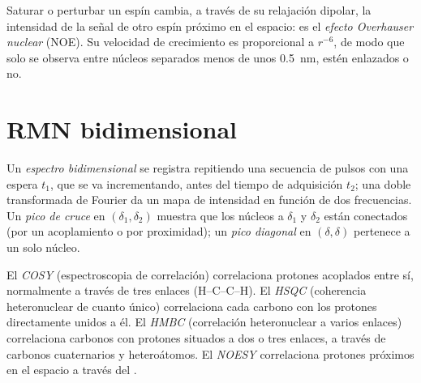 \begin{definition}\label{def:b3:advanced-nmr:noe}
Saturar o perturbar un espín cambia, a través de su relajación
dipolar, la intensidad de la señal de otro espín próximo en el espacio:
es el \emph{efecto Overhauser nuclear} (NOE).
Su velocidad de crecimiento es proporcional a $r^{-6}$, de modo que solo se observa entre
núcleos separados menos de unos \qty{0.5}{nm}, estén enlazados o no.
\end{definition}

\section{RMN bidimensional}

\begin{definition}\label{def:b3:advanced-nmr:two-d}
Un \emph{espectro bidimensional} se registra
repitiendo una secuencia de pulsos con una espera $t_1$, que se va incrementando, antes del
tiempo de adquisición $t_2$; una doble transformada de Fourier da un mapa de intensidad
en función de dos frecuencias. Un \emph{pico de cruce} en $(\delta_1,
\delta_2)$ muestra que los núcleos a $\delta_1$ y $\delta_2$ están conectados (por un acoplamiento o
por proximidad); un \emph{pico diagonal} en $(\delta, \delta)$ pertenece a
un solo núcleo.
\end{definition}

\begin{definition}\label{def:b3:advanced-nmr:experiments}
El \emph{COSY} (espectroscopia de correlación) correlaciona protones acoplados
entre sí, normalmente a través de tres enlaces (H--C--C--H). El \emph{HSQC}
(coherencia heteronuclear de cuanto único) correlaciona cada carbono con los
protones directamente unidos a él. El \emph{HMBC} (correlación heteronuclear
a varios enlaces) correlaciona carbonos con protones situados a dos o tres enlaces,
a través de carbonos cuaternarios y heteroátomos. El \emph{NOESY}
correlaciona protones próximos en el espacio a través del .
\end{definition}

